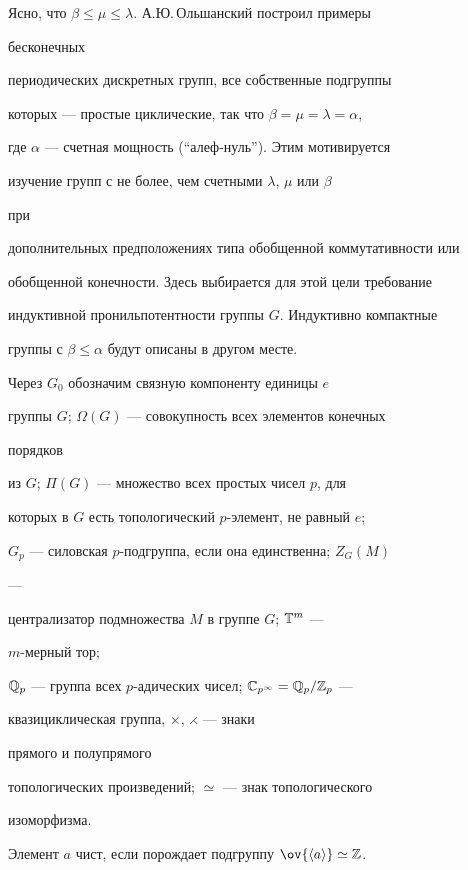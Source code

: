 Ясно, что $\beta\le\mu\le\lambda$. А.Ю.\,Ольшанский построил примеры 


бесконечных 


периодических дискретных групп, все собственные подгруппы 


которых --- простые циклические, так что $\beta=\mu=\lambda=\alpha$, 


где $\alpha$ --- счетная мощность (``алеф-нуль''). Этим мотивируется 


изучение групп с не более, чем счетными $\lambda$, $\mu$ или $\beta$ 


при 


дополнительных предположениях типа обобщенной коммутативности или  


обобщенной конечности. Здесь выбирается для этой цели требование 


индуктивной пронильпотентности группы $G$. Индуктивно компактные 


группы с $\beta\le\alpha$ будут описаны в другом месте.  


 


Через $G_0$ обозначим связную компоненту единицы $e$ 


группы $G$; $\Omega(G)$ --- совокупность всех элементов конечных 


порядков 


из $G$; $\Pi(G)$ --- множество всех простых чисел $p$, для  


которых в $G$ есть топологический $p$-элемент, не равный $e$; 


$G_p$ --- силовская $p$-подгруппа, если она единственна; $Z_G(M)$ 


--- 


централизатор подмножества $M$ в группе $G$; $\Bbb T^m$ --- 


$m$-мерный тор; 


$\Bbb Q_p$ --- группа всех $p$-адических чисел; $\Bbb 


C_{p^\infty}=\Bbb Q_p/\Bbb Z_p$ ---  


квазициклическая группа, $\times$, $\rightthreetimes$ --- знаки 


прямого и полупрямого  


топологических произведений; $\simeq$ --- знак топологического 


изоморфизма. 


Элемент $a$ чист, если порождает подгруппу $\ov{\la a\ra}\simeq\Bbb 


Z$. 


